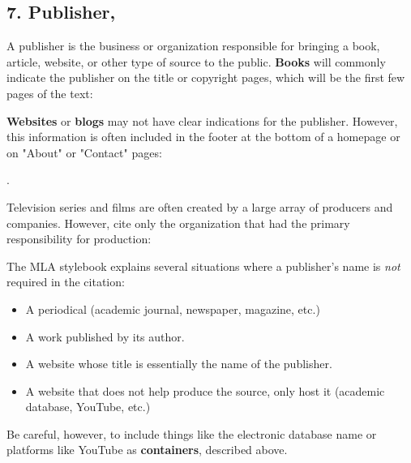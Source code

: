 

\subsection{7. Publisher,}

A publisher is the business or organization responsible for bringing a book, article, website, or other type of source to the public. \textbf{Books} will commonly indicate the publisher on the title or copyright pages, which will be the first few pages of the text: \bigskip 

\bigskip

\noindent \textbf{Websites} or \textbf{blogs} may not have clear indications for the publisher. However, this information is often included in the footer at the bottom of a homepage or on "About" or "Contact" pages: \medskip

. \bigskip

\noindent Television series and films are often created by a large array of producers and companies. However, cite only the organization that had the primary responsibility for production:\bigskip 

\bigskip



\begin{center}
\begin{tcolorbox}[colframe=oyster, coltitle=black, sharp corners, title=\ding{52} When \emph{not} to include the publisher]
The MLA stylebook explains several situations where a publisher's name is \emph{not} required in the citation: 

\begin{itemize}
\item A periodical (academic journal, newspaper, magazine, etc.)
\item A work published by its author.
\item A website whose title is essentially the name of the publisher.
\item A website that does not help produce the source, only host it (academic database, YouTube, etc.)
\end{itemize}

\medskip

Be careful, however, to include things like the electronic database name or platforms like YouTube as \textbf{containers}, described above.


\end{tcolorbox}
\end{center}




